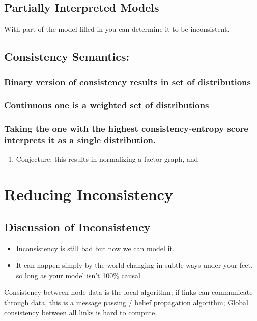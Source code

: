 \documentclass[11pt]{article}
\begin{document}
\subsection{Partially Interpreted Models}
\label{sec:orgd0a09fb}
With part of the model filled in you can determine it to be inconsistent.


\subsection{Consistency Semantics:}
\label{sec:orga9b078b}
\subsubsection{Binary version of consistency results in set of distributions}
\label{sec:orgad1c4d5}
\subsubsection{Continuous one is a weighted set of distributions}
\label{sec:orga20c7d4}
\subsubsection{Taking the one with the highest consistency-entropy score interprets it as a single distribution.}
\label{sec:org716991c}
\begin{enumerate}
\item Conjecture: this results in normalizing a factor graph, and
\label{sec:orgd5f515e}
\end{enumerate}

\section{Reducing Inconsistency}
\label{sec:orgc9b4e8b}
\subsection{Discussion of Inconsistency}
\label{sec:org3240f42}
\begin{itemize}
\item Inconsistency is still bad but now we can model it.
\item It can happen simply by the world changing in subtle ways under your feet, so long as your model isn't 100\% causal
\end{itemize}

Consistency between node data is the local algorithm; if links can communicate through data, this is a message passing  / belief propagation algorithm; Global consistency between all links is hard to compute. 
\end{document}
